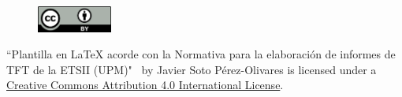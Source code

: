 \documentclass[a4paper, 11pt, spanish, twoside]{article}
\newcommand\blankpage{%
    \null
    \thispagestyle{empty}%
    \newpage}
\begin{document}
\begin{figure}
    \vspace{-\baselineskip}
    \href{http://creativecommons.org/licenses/by/4.0/}{\includegraphics[width=0.22\textwidth]{cc-by.png}}
\end{figure} 

\vspace*{\fill}
``Plantilla en LaTeX acorde con la Normativa para la elaboración de informes de TFT de la ETSII (UPM)" \ by Javier Soto Pérez-Olivares is licensed under a \href{http://creativecommons.org/licenses/by/4.0/}{Creative Commons Attribution 4.0 International License}.

\afterpage{\blankpage} %




\newpage

\renewcommand*\contentsname{ÍNDICE} %

\tableofcontents %

\afterpage{\blankpage} %
\end{document}
